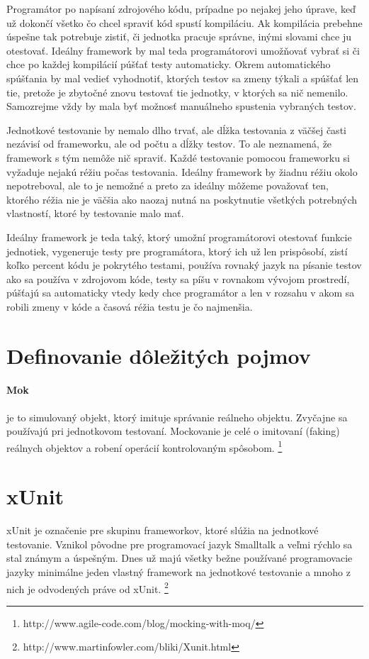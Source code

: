 \documentclass[11pt,twoside,slovak,a4paper]{article}
\begin{document}
		Programátor po napísaní zdrojového kódu, prípadne po nejakej jeho úprave, keď už dokončí všetko čo chcel spraviť kód spustí kompiláciu. Ak kompilácia prebehne úspešne tak potrebuje zistiť, či jednotka pracuje správne, inými slovami chce ju otestovať. Ideálny framework by mal teda programátorovi umožňovať vybrať si či chce po každej kompilácií púšťať testy automaticky. Okrem automatického spúšťania by mal vedieť vyhodnotiť, ktorých testov sa zmeny týkali a spúšťať len tie, pretože je zbytočné znovu testovať tie jednotky, v ktorých sa nič nemenilo. Samozrejme vždy by mala byť možnosť manuálneho spustenia vybraných testov. 
		
		Jednotkové testovanie by nemalo dlho trvať, ale dĺžka testovania z väčšej časti nezávisí od frameworku, ale od počtu a dĺžky testov. To ale neznamená, že framework s tým nemôže nič spraviť. Každé testovanie pomocou frameworku si vyžaduje nejakú réžiu počas testovania. Ideálny framework by žiadnu réžiu okolo nepotreboval, ale to je nemožné a preto za ideálny môžeme považovať ten, ktorého réžia nie je väčšia ako naozaj nutná na poskytnutie všetkých potrebných vlastností, ktoré by testovanie malo mať. 
		
		Ideálny framework je teda taký, ktorý umožní programátorovi otestovať funkcie jednotiek, vygeneruje testy pre programátora, ktorý ich už len prispôsobí, zistí koľko percent kódu je pokrytého testami, používa rovnaký jazyk na písanie testov ako sa používa v zdrojovom kóde, testy sa píšu v rovnakom vývojom prostredí, púšťajú sa automaticky vtedy kedy chce programátor a len v rozsahu v akom sa robili zmeny v kóde a časová réžia testu je čo najmenšia.
		
	\section{Definovanie dôležitých pojmov}
		\paragraph{Mok} je to simulovaný objekt, ktorý imituje správanie reálneho objektu. Zvyčajne sa používajú pri jednotkovom testovaní. Mockovanie je celé o imitovaní (faking) reálnych objektov a robení operácií kontrolovaným spôsobom. \footnote{http://www.agile-code.com/blog/mocking-with-moq/}
	
	\section{xUnit}
		xUnit je označenie pre skupinu frameworkov, ktoré slúžia na jednotkové testovanie. Vznikol pôvodne pre programovací jazyk Smalltalk a veľmi rýchlo sa stal známym a úspešným. Dnes už majú všetky bežne používané programovacie jazyky minimálne jeden vlastný framework na jednotkové testovanie a mnoho z nich je odvodených práve od xUnit. 		\footnote{http://www.martinfowler.com/bliki/Xunit.html} \newline
\end{document}
